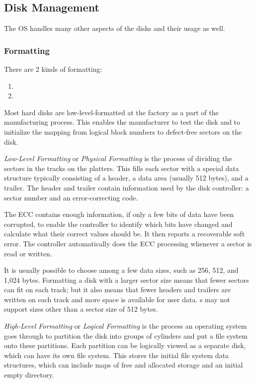 \subsection{Disk Management}\label{subsec:Disk_Management}
The OS handles many other aspects of the disks and their usage as well.

\subsubsection{Formatting}\label{subsubsec:Formatting}
There are 2 kinds of formatting:
\begin{enumerate}[noitemsep]
\item {}
\item {}
\end{enumerate}

Most hard disks are low-level-formatted at the factory as a part of the manufacturing process.
This enables the manufacturer to test the disk and to initialize the mapping from logical block numbers to defect-free sectors on the disk.

\begin{definition}\label{def:Low_Level_Formatting}
  \emph{Low-Level Formatting} or \emph{Physical Formatting} is the process of dividing the sectors in the tracks on the platters.
  This fills each sector with a special data structure typically consisting of a header, a data area (usually 512 bytes), and a trailer.
  The header and trailer contain information used by the disk controller: a sector number and an error-correcting code.
\end{definition}

The ECC contains enough information, if only a few bits of data have been corrupted, to enable the controller to identify which bits have changed and calculate what their correct values should be.
It then reports a recoverable soft error.
The controller automatically does the ECC processing whenever a sector is read or written.

It is usually possible to choose among a few data sizes, such as 256, 512, and 1,024 bytes.
Formatting a disk with a larger sector size means that fewer sectors can fit on each track; but it also means that fewer headers and trailers are written on each track and more space is available for user data.
s may not support sizes other than a sector size of 512 bytes.

\begin{definition}\label{def:High_Level_Formatting}
  \emph{High-Level Formatting} or \emph{Logical Formatting} is the process an operating system goes through to partition the disk into groups of cylinders and put a file system onto these partitions.
  Each partition can be logically viewed as a separate disk, which can have its own file system.
  This stores the initial file system data structures, which can include maps of free and allocated storage and an initial empty directory.
\end{definition}



